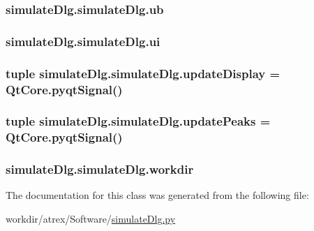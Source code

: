 \hypertarget{classsimulate_dlg_1_1simulate_dlg_a5aa51d22e30acd26145131e848e30759}{
\subsubsection[{ub}]{\setlength{\rightskip}{0pt plus 5cm}simulate\-Dlg.\-simulate\-Dlg.\-ub}}\label{classsimulate_dlg_1_1simulate_dlg_a5aa51d22e30acd26145131e848e30759}
\hypertarget{classsimulate_dlg_1_1simulate_dlg_a23a3d39d70f0ae6ce8a838fe680afd08}{
\subsubsection[{ui}]{\setlength{\rightskip}{0pt plus 5cm}simulate\-Dlg.\-simulate\-Dlg.\-ui}}\label{classsimulate_dlg_1_1simulate_dlg_a23a3d39d70f0ae6ce8a838fe680afd08}
\hypertarget{classsimulate_dlg_1_1simulate_dlg_a1c6d77c7b4759cb95a7fbdd5a7ca23d7}{
\subsubsection[{update\-Display}]{\setlength{\rightskip}{0pt plus 5cm}tuple simulate\-Dlg.\-simulate\-Dlg.\-update\-Display = Qt\-Core.\-pyqt\-Signal()\hspace{0.3cm}{\ttfamily [static]}}}\label{classsimulate_dlg_1_1simulate_dlg_a1c6d77c7b4759cb95a7fbdd5a7ca23d7}
\hypertarget{classsimulate_dlg_1_1simulate_dlg_a14c3146ee7422f53d8488a114344800e}{
\subsubsection[{update\-Peaks}]{\setlength{\rightskip}{0pt plus 5cm}tuple simulate\-Dlg.\-simulate\-Dlg.\-update\-Peaks = Qt\-Core.\-pyqt\-Signal()\hspace{0.3cm}{\ttfamily [static]}}}\label{classsimulate_dlg_1_1simulate_dlg_a14c3146ee7422f53d8488a114344800e}
\hypertarget{classsimulate_dlg_1_1simulate_dlg_a217be5c43518b4f44ac9f9397e4cd155}{
\subsubsection[{workdir}]{\setlength{\rightskip}{0pt plus 5cm}simulate\-Dlg.\-simulate\-Dlg.\-workdir}}\label{classsimulate_dlg_1_1simulate_dlg_a217be5c43518b4f44ac9f9397e4cd155}


The documentation for this class was generated from the following file\-:\begin{DoxyCompactItemize}
\item 
workdir/atrex/\-Software/\hyperlink{simulate_dlg_8py}{simulate\-Dlg.\-py}\end{DoxyCompactItemize}
